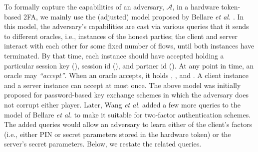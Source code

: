 %
To formally capture the capabilities of an adversary, $\mathcal{A}$, in a hardware token-based 2FA,  we mainly use the (adjusted) model proposed by Bellare \textit{et al.} \cite{BellarePR00}. In this model, the adversary’s capabilities are cast via various queries that it sends to different oracles, i.e., instances of the honest parties; the client and server interact with each other for some fixed number of flows, until both instances have terminated. By that time, each instance should have accepted holding a particular session key (\seckey), session id (\SID), and partner id (\PID). At any point in time, an oracle may \emph{``accept''}. When an oracle accepts, it holds \seckey, \SID, and \PID. A client instance and a server instance can accept at most once. The above model was initially proposed for password-based key exchange schemes in which the adversary does not corrupt either player.  Later, Wang \textit{et al.} \cite{WangW18}  added a few more queries to the model of  Bellare \textit{et al.} to make it suitable for two-factor authentication schemes. The added queries would allow an adversary to learn either of the client's factors (i.e., either PIN or secret parameters stored in the hardware token) or the server's secret parameters.  Below, we restate the related queries. 
 





